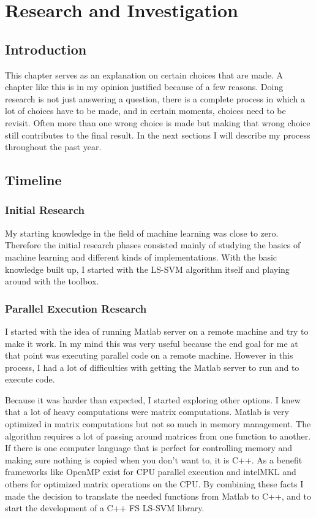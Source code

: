 \chapter{Research and Investigation}
\section{Introduction}
This chapter serves as an explanation on certain choices that are made.
A chapter like this is in my opinion justified because of a few reasons.
Doing research is not just answering a question, there is a complete process in which a lot of choices have to be made,
and in certain moments, choices need to be revisit. 
Often more than one wrong choice is made but making that wrong choice still contributes to the final result.
In the next sections I will describe my process throughout the past year.
\section{Timeline}
\subsection{Initial Research}
My starting knowledge in the field of machine learning was close to zero.
Therefore the initial research phases consisted mainly of studying the basics of machine learning and different kinds of implementations.
With the basic knowledge built up, I started with the LS-SVM algorithm itself and playing around with the toolbox.
\subsection{Parallel Execution Research}
I started with the idea of running Matlab server on a remote machine and try to make it work.
In my mind this was very useful because the end goal for me at that point was executing parallel code on a remote machine.
However in this process, I had a lot of difficulties with getting the Matlab server to run and to execute code.
\par 
Because it was harder than expected, I started exploring other options.
I knew that a lot of heavy computations were matrix computations.
Matlab is very optimized in matrix computations but not so much in memory management.
The algorithm requires a lot of passing around matrices from one function to another.
If there is one computer language that is perfect for controlling memory and making sure nothing is copied when you don't want to, it is C++.
As a benefit frameworks like OpenMP exist for CPU parallel execution and intelMKL and others for optimized matrix operations on the CPU.
By combining these facts I made the decision to translate the needed functions from Matlab to C++, and to start the development of a C++ FS LS-SVM library.
